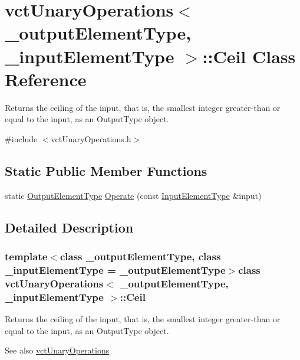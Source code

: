 \hypertarget{classvct_unary_operations_1_1_ceil}{}\section{vct\+Unary\+Operations$<$ \+\_\+output\+Element\+Type, \+\_\+input\+Element\+Type $>$\+:\+:Ceil Class Reference}
\label{classvct_unary_operations_1_1_ceil}


Returns the ceiling of the input, that is, the smallest integer greater-\/than or equal to the input, as an Output\+Type object.  




{\ttfamily \#include $<$vct\+Unary\+Operations.\+h$>$}

\subsection*{Static Public Member Functions}
\begin{DoxyCompactItemize}
\item 
static \hyperlink{classvct_unary_operations_a42306ac3dd20d32c6d6c66ac3fa2e7b9}{Output\+Element\+Type} \hyperlink{classvct_unary_operations_1_1_ceil_a78d130b965b8fddf23d1c694d5941068}{Operate} (const \hyperlink{classvct_unary_operations_abf3b77bb7b8abd7ba72a6a45a65696a7}{Input\+Element\+Type} \&input)
\end{DoxyCompactItemize}


\subsection{Detailed Description}
\subsubsection*{template$<$class \+\_\+output\+Element\+Type, class \+\_\+input\+Element\+Type = \+\_\+output\+Element\+Type$>$class vct\+Unary\+Operations$<$ \+\_\+output\+Element\+Type, \+\_\+input\+Element\+Type $>$\+::\+Ceil}

Returns the ceiling of the input, that is, the smallest integer greater-\/than or equal to the input, as an Output\+Type object. 

\begin{DoxySeeAlso}{See also}
\hyperlink{classvct_unary_operations}{vct\+Unary\+Operations} 
\end{DoxySeeAlso}


